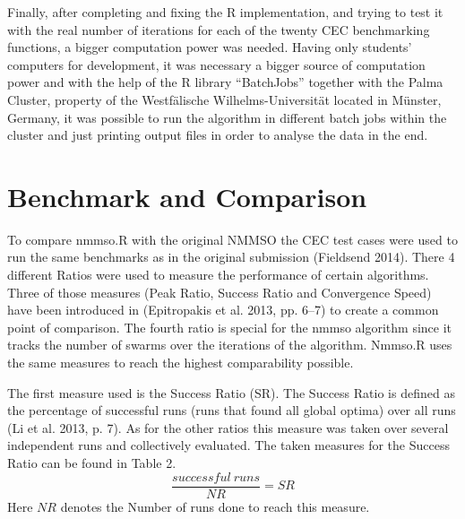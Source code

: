 \documentclass[12pt,a4paper]{article}
\begin{document}
Finally, after completing and fixing the R implementation, and trying to
test it with the real number of iterations for each of the twenty CEC
benchmarking functions, a bigger computation power was needed. Having
only students' computers for development, it was necessary a bigger
source of computation power and with the help of the R library
``BatchJobs'' together with the Palma Cluster, property of the
Westfälische Wilhelms-Universität located in Münster, Germany, it was
possible to run the algorithm in different batch jobs within the cluster
and just printing output files in order to analyse the data in the end.

\section{Benchmark and Comparison}\label{benchmark-and-comparison}

To compare nmmso.R with the original NMMSO the CEC test cases were used
to run the same benchmarks as in the original submission (Fieldsend
2014). There 4 different Ratios were used to measure the performance of
certain algorithms. Three of those measures (Peak Ratio, Success Ratio
and Convergence Speed) have been introduced in (Epitropakis et al. 2013,
pp. 6--7) to create a common point of comparison. The fourth ratio is
special for the nmmso algorithm since it tracks the number of swarms
over the iterations of the algorithm. Nmmso.R uses the same measures to
reach the highest comparability possible.

The first measure used is the Success Ratio (SR). The Success Ratio is
defined as the percentage of successful runs (runs that found all global
optima) over all runs (Li et al. 2013, p. 7). As for the other ratios
this measure was taken over several independent runs and collectively
evaluated. The taken measures for the Success Ratio can be found in
Table 2. \[\frac{successful\ runs}{NR} = SR \] Here \(NR\) denotes the
Number of runs done to reach this measure. \newline
\end{document}
